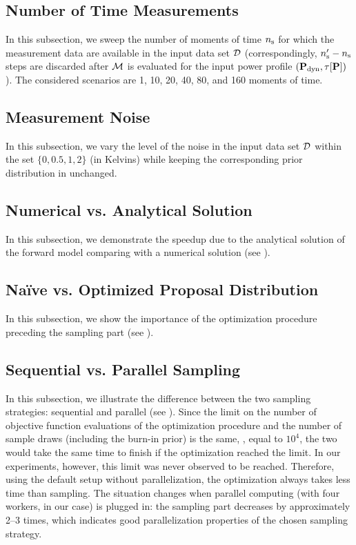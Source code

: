 \subsection{Number of Time Measurements}
In this subsection, we sweep the number of moments of time ${n_\text{s}}$ for which the measurement data are available in the input data set $\mathcal{D}$ (correspondingly, ${n_\text{s}'} - {n_\text{s}}$ steps are discarded after $\model$ is evaluated for the input power profile $(\mathbf{P}_{\text{dyn}}, \tau[\mathbf{P}])$). The considered scenarios are 1, 10, 20, 40, 80, and 160 moments of time.

\subsection{Measurement Noise}
In this subsection, we vary the level of the noise in the input data set $\mathcal{D}$ within the set $\{ 0, 0.5, 1, 2 \}$ (in Kelvins) while keeping the corresponding prior distribution in  unchanged.

\subsection{Numerical vs. Analytical Solution}
In this subsection, we demonstrate the speedup due to the analytical solution of the forward model comparing with a numerical solution (see ).

\subsection{Na\"{i}ve vs. Optimized Proposal Distribution}
In this subsection, we show the importance of the optimization procedure preceding the sampling part (see ).

\subsection{Sequential vs. Parallel Sampling}
In this subsection, we illustrate the difference between the two sampling strategies: sequential and parallel (see ). Since the limit on the number of objective function evaluations of the optimization procedure and the number of sample draws (including the burn-in prior) is the same, \ie, equal to $10^4$, the two would take the same time to finish if the optimization reached the limit. In our experiments, however, this limit was never observed to be reached. Therefore, using the default setup without parallelization, the optimization always takes less time than sampling. The situation changes when parallel computing (with four workers, in our case) is plugged in: the sampling part decreases by approximately 2–3 times, which indicates good parallelization properties of the chosen sampling strategy.
